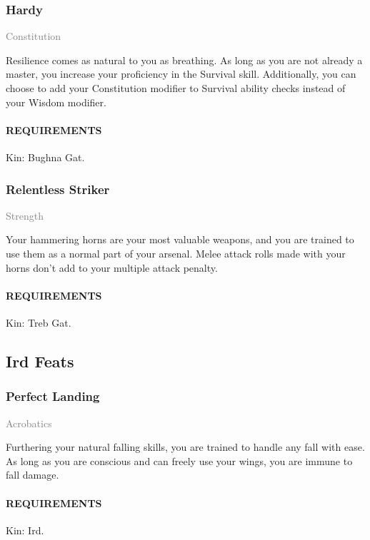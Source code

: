     \subsubsection{Hardy} \label{feat::hardy}
    \small{\textcolor{gray}{Constitution}}

    \normalsize
    Resilience comes as natural to you as breathing.
    As long as you are not already a master, you increase your proficiency in the Survival skill.
    Additionally, you can choose to add your Constitution modifier to Survival ability checks instead of your Wisdom modifier.
    \paragraph{REQUIREMENTS} Kin: Bughna Gat.

    \subsubsection{Relentless Striker} \label{feat::relentlessstriker}
    \small{\textcolor{gray}{Strength}}

    \normalsize
    Your hammering horns are your most valuable weapons, and you are trained to use them as a normal part of your arsenal.
    Melee attack rolls made with your horns don't add to your multiple attack penalty.
    \paragraph{REQUIREMENTS} Kin: Treb Gat.

\subsection*{Ird Feats}
    \subsubsection{Perfect Landing} \label{feat::perfectlanding}
    \small{\textcolor{gray}{Acrobatics}}

    \normalsize
    Furthering your natural falling skills, you are trained to handle any fall with ease.
    As long as you are conscious and can freely use your wings, you are immune to fall damage.
    \paragraph{REQUIREMENTS} Kin: Ird.

